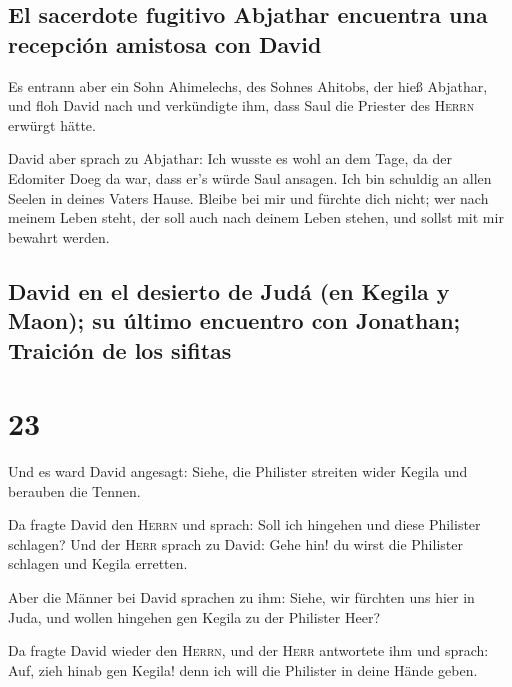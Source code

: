 \hypertarget{el-sacerdote-fugitivo-abjathar-encuentra-una-recepciuxf3n-amistosa-con-david}{%
\subsection{El sacerdote fugitivo Abjathar encuentra una recepción
amistosa con
David}\label{el-sacerdote-fugitivo-abjathar-encuentra-una-recepciuxf3n-amistosa-con-david}}

 Es entrann aber ein Sohn Ahimelechs, des Sohnes Ahitobs,
der hieß Abjathar, und floh David nach  und verkündigte
ihm, dass Saul die Priester des \textsc{Herrn} erwürgt hätte.

 David aber sprach zu Abjathar: Ich wusste es wohl an dem
Tage, da der Edomiter Doeg da war, dass er's würde Saul ansagen. Ich bin
schuldig an allen Seelen in deines Vaters Hause.  Bleibe
bei mir und fürchte dich nicht; wer nach meinem Leben steht, der soll
auch nach deinem Leben stehen, und sollst mit mir bewahrt werden.

\hypertarget{david-en-el-desierto-de-juduxe1-en-kegila-y-maon-su-uxfaltimo-encuentro-con-jonathan-traiciuxf3n-de-los-sifitas}{%
\subsection{David en el desierto de Judá (en Kegila y Maon); su último
encuentro con Jonathan; Traición de los
sifitas}\label{david-en-el-desierto-de-juduxe1-en-kegila-y-maon-su-uxfaltimo-encuentro-con-jonathan-traiciuxf3n-de-los-sifitas}}

\hypertarget{section-22}{%
\section{23}\label{section-22}}

 Und es ward David angesagt: Siehe, die Philister streiten
wider Kegila und berauben die Tennen.

 Da fragte David den \textsc{Herrn} und sprach: Soll ich
hingehen und diese Philister schlagen? Und der \textsc{Herr} sprach zu
David: Gehe hin! du wirst die Philister schlagen und Kegila erretten.

 Aber die Männer bei David sprachen zu ihm: Siehe, wir
fürchten uns hier in Juda, und wollen hingehen gen Kegila zu der
Philister Heer?

 Da fragte David wieder den \textsc{Herrn}, und der
\textsc{Herr} antwortete ihm und sprach: Auf, zieh hinab gen Kegila!
denn ich will die Philister in deine Hände geben.

